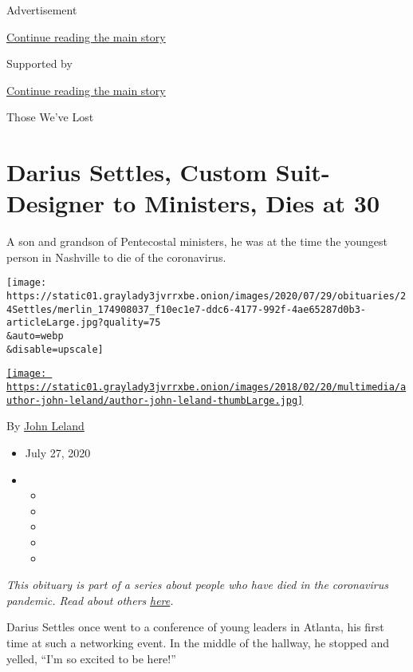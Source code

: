 Advertisement

\protect\hyperlink{after-top}{Continue reading the main story}

Supported by

\protect\hyperlink{after-sponsor}{Continue reading the main story}

Those We've Lost

\hypertarget{darius-settles-custom-suit-designer-to-ministers-dies-at-30}{%
\section{Darius Settles, Custom Suit-Designer to Ministers, Dies at
30}\label{darius-settles-custom-suit-designer-to-ministers-dies-at-30}}

A son and grandson of Pentecostal ministers, he was at the time the
youngest person in Nashville to die of the coronavirus.

\texttt{[image: https://static01.graylady3jvrrxbe.onion/images/2020/07/29/obituaries/24Settles/merlin\_174908037\_f10ec1e7-ddc6-4177-992f-4ae65287d0b3-articleLarge.jpg?quality=75\\\&auto=webp\\\&disable=upscale]}

\href{https://www.nytimes3xbfgragh.onion/by/john-leland}{\texttt{[image: https://static01.graylady3jvrrxbe.onion/images/2018/02/20/multimedia/author-john-leland/author-john-leland-thumbLarge.jpg]}}

By \href{https://www.nytimes3xbfgragh.onion/by/john-leland}{John Leland}

\begin{itemize}
\item
  July 27, 2020
\item
  \begin{itemize}
  \item
  \item
  \item
  \item
  \item
  \end{itemize}
\end{itemize}

\emph{This obituary is part of a series about people who have died in
the coronavirus pandemic. Read about others}
\href{https://www.nytimes3xbfgragh.onion/interactive/2020/obituaries/people-died-coronavirus-obituaries.html}{\emph{here}}\emph{.}

Darius Settles once went to a conference of young leaders in Atlanta,
his first time at such a networking event. In the middle of the hallway,
he stopped and yelled, ``I'm so excited to be here!''


